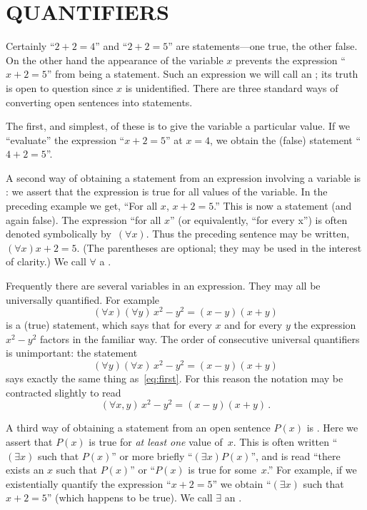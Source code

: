 \chapter{QUANTIFIERS}\label{quan}

 \setcounter{section}{1}
 \setcounter{thm}{0}

Certainly  ``$2 + 2 = 4$'' and  ``$2 + 2 = 5$'' are statements---one true, the other false. On
the other hand the appearance of the variable  $x$ prevents the expression  ``$x + 2 = 5$''
from being a statement.  Such an expression we will call an
; its truth is open to question since $x$ is unidentified.  There are three
standard ways of converting open sentences into statements.

The first, and simplest, of these is to give the variable a particular value. If we
``evaluate'' the expression  ``$x + 2 = 5$'' at $x = 4$, we obtain the (false) statement ``$4
+ 2 = 5$''.

A second way of obtaining a statement from an expression involving a variable is : we assert that the expression is true for all values of the variable.  In the
preceding example we get, ``For all  $x$, $x + 2 = 5$.'' This is now a statement (and again
false). The expression ``for all $x$'' (or equivalently, ``for every x'') is often denoted
symbolically
by~$(\forall x)$.  Thus the preceding sentence may be written, $(\forall x) x + 2 = 5$.  (The
parentheses are optional; they may be used in the interest of clarity.) We call $\forall$ a
.

Frequently there are several variables in an expression.  They may all be universally
quantified.  For example
  \begin{equation}\label{eq:first}
             (\forall x)(\forall y)\, x^2 - y^2 = (x - y)(x + y)
  \end{equation}
is a (true) statement, which says that for every $x$ and for every $y$ the expression $x^2 -
y^2$ factors in the familiar way.  The order of consecutive universal quantifiers is
unimportant: the statement
  \[ (\forall y)(\forall x)\, x^2 - y^2 = (x - y)(x + y) \]
says exactly the same thing as~\eqref{eq:first}.  For this reason the notation may be
contracted slightly to read
  \[ (\forall x,y)\, x^2 - y^2 = (x - y)(x + y)\,. \]

A third way of obtaining a statement from an open sentence $P(x)$ is .  Here we assert that  $P(x)$ is true for \emph{at least one} value of~$x$.
This is often written
``$(\exists x)$ such that $P(x)$'' or more briefly ``$(\exists x) P(x)$'', and is read ``there
exists an $x$ such that $P(x)$'' or ``$P(x)$ is true for some~$x$.''  For example, if we
existentially quantify the expression ``$x + 2 = 5$'' we obtain  ``$(\exists x)$ such that $x
+ 2 = 5$'' (which happens to be true).  We call $\exists$ an
.

